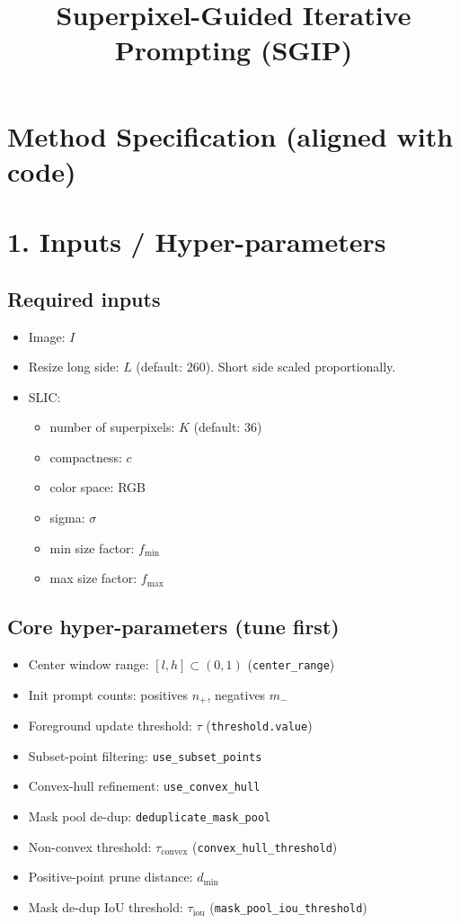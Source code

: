 \documentclass[11pt]{article}
\title{Superpixel-Guided Iterative Prompting (SGIP)}
\author{}
\date{}
\begin{document}
\maketitle

\newpage
\section*{Method Specification (aligned with code)}

\section*{1. Inputs / Hyper-parameters}

\subsection*{Required inputs}
\begin{itemize}[leftmargin=1.25em]
  \item Image: $I$
  \item Resize long side: $L$ (default: 260). Short side scaled proportionally.
  \item SLIC:
  \begin{itemize}[leftmargin=1.25em]
    \item number of superpixels: $K$ (default: 36)
    \item compactness: $c$
    \item color space: RGB
    \item sigma: $\sigma$
    \item min size factor: $f_{\min}$
    \item max size factor: $f_{\max}$
  \end{itemize}
\end{itemize}

\subsection*{Core hyper-parameters (tune first)}
\begin{itemize}[leftmargin=1.25em]
  \item Center window range: $[l,h]\subset(0,1)$ (\texttt{center\_range})
  \item Init prompt counts: positives $n_+$, negatives $m_-$
  \item Foreground update threshold: $\tau$ (\texttt{threshold.value})
  \item Subset-point filtering: \texttt{use\_subset\_points}
  \item Convex-hull refinement: \texttt{use\_convex\_hull}
  \item Mask pool de-dup: \texttt{deduplicate\_mask\_pool}
  \item Non-convex threshold: $\tau_{\text{convex}}$ (\texttt{convex\_hull\_threshold})
  \item Positive-point prune distance: $d_{\min}$
  \item Mask de-dup IoU threshold: $\tau_{\text{iou}}$ (\texttt{mask\_pool\_iou\_threshold})
\end{itemize}
\end{document}
